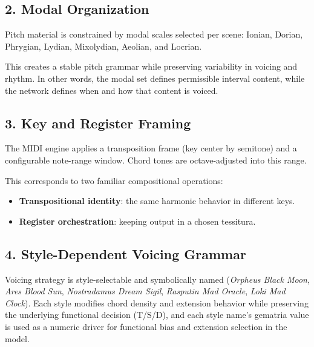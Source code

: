\documentclass[11pt,a4paper]{article}
\begin{document}
\subsection*{2. Modal Organization}

Pitch material is constrained by modal scales selected per scene:
Ionian, Dorian, Phrygian, Lydian, Mixolydian, Aeolian, and Locrian.

This creates a stable pitch grammar while preserving variability in voicing and rhythm.
In other words, the modal set defines permissible interval content, while the network defines
when and how that content is voiced.

\subsection*{3. Key and Register Framing}

The MIDI engine applies a transposition frame (key center by semitone) and a configurable
note-range window. Chord tones are octave-adjusted into this range.

This corresponds to two familiar compositional operations:
\begin{itemize}
    \item \textbf{Transpositional identity}: the same harmonic behavior in different keys.
    \item \textbf{Register orchestration}: keeping output in a chosen tessitura.
\end{itemize}

\subsection*{4. Style-Dependent Voicing Grammar}

Voicing strategy is style-selectable and symbolically named
(\emph{Orpheus Black Moon}, \emph{Ares Blood Sun},
\emph{Nostradamus Dream Sigil}, \emph{Rasputin Mad Oracle}, \emph{Loki Mad Clock}).
Each style modifies chord density and extension behavior while preserving
the underlying functional decision (T/S/D), and each style name's gematria value
is used as a numeric driver for functional bias and extension selection in the model.
\end{document}
